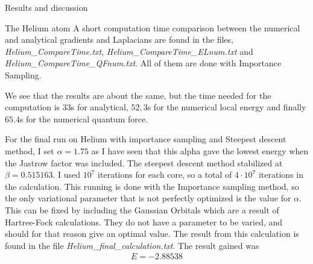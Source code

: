 \documentclass[a4paper, 12pt, titlepage]{article}
\begin{document}
\begin{section}{Results and discussion}
\begin{subsection}{The Helium atom}
	 A short computation time comparison between the numerical and analytical gradients and Laplacians are found in the files, \textit{Helium\_CompareTime.txt}, \textit{Helium\_CompareTime\_ELnum.txt} and \textit{Helium\_CompareTime\_QFnum.txt}. All of them are done with Importance Sampling. 

	 We see that the results are about the same, but the time needed for the computation is $33$s for analytical, $52,3$s for the numerical local energy and finally $65.4$s for the numerical quantum force. 

	 For the final run on Helium with importance sampling and Steepest descent method, I set $\alpha = 1.75$ as I have seen that this alpha gave the lowest energy when the Jastrow factor was included. The steepest descent method stabilized at $\beta = 0.515163$. I used $10^7$ iterations for each core, so a total of $4 \cdot 10^7$ iterations in the calculation. This running is done with the Importance sampling method, so the only variational parameter that is not perfectly optimized is the value for $\alpha$. This can be fixed by including the Gaussian Orbitals which are a result of Hartree-Fock calculations. They do not have a parameter to be varied, and should for that reason give an optimal value. The result from this calculation is found in the file \textit{Helium\_final\_calculation.txt}. The result gained was
	 \begin{align*}
	 	E = -2.88538
	 \end{align*}
   	

\end{subsection}
\end{section}
\end{document}
